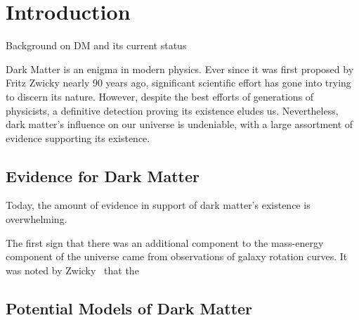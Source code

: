 \graphicspath{{img/chapter_1/}}

\chapter{Introduction}
\label{chapter:introduction}

\begin{synopsis}
Background on DM and its current status
\end{synopsis}

Dark Matter is an enigma in modern physics. Ever since it was first 
proposed by Fritz Zwicky nearly 90 years ago, significant scientific
effort has gone into trying to discern its nature. However, despite the
best efforts of generations of physicists, a definitive detection
proving its existence eludes us. Nevertheless, dark matter's influence 
on our universe is undeniable, with a large assortment of evidence 
supporting its existence. 


\section{Evidence for Dark Matter}

Today, the amount of evidence in support of dark matter's existence is overwhelming. 

The first sign that there was an additional component to the mass-energy component of the universe came from observations of galaxy rotation curves. It was noted by Zwicky~\cite{Zwicky:1937zza_MassesNebulaeClusters} that the 

\section{Potential Models of Dark Matter}



